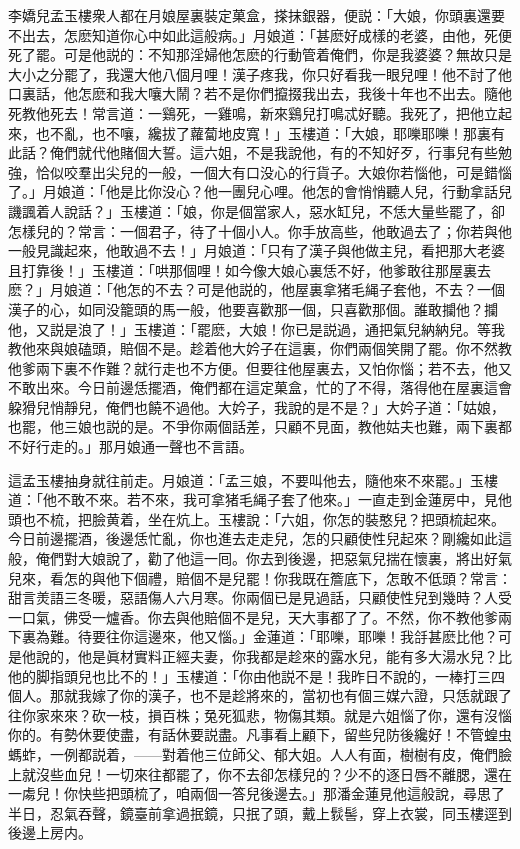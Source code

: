 李嬌兒孟玉樓衆人都在月娘屋裏裝定菓盒，搽抹銀器，便説：「大娘，你頭裏還要不出去，怎麽知道你心中如此這般病。」月娘道：「甚麽好成樣的老婆，由他，死便死了罷。可是他説的：不知那淫婦他怎麽的行動管着俺們，你是我婆婆？無故只是大小之分罷了，我還大他八個月哩！漢子疼我，你只好看我一眼兒哩！他不討了他口裏話，他怎麽和我大嚷大鬧？若不是你們攛掇我出去，我後十年也不出去。隨他死教他死去！常言道：一鷄死，一雞鳴，新來鷄兒打鳴忒好聽。我死了，把他立起來，也不亂，也不嚷，纔拔了蘿蔔地皮寬！」玉樓道：「大娘，耶嚛耶嚛！那裏有此話？俺們就代他賭個大誓。這六姐，不是我說他，有的不知好歹，行事兒有些勉強，恰似咬羣出尖兒的一般，一個大有口没心的行貨子。大娘你若惱他，可是錯惱了。」月娘道：「他是比你没心？他一團兒心哩。他怎的會悄悄聽人兒，行動拿話兒譏諷着人說話？」玉樓道：「娘，你是個當家人，惡水缸兒，不恁大量些罷了，卻怎樣兒的？常言：一個君子，待了十個小人。你手放高些，他敢過去了；你若與他一般見識起來，他敢過不去！」月娘道：「只有了漢子與他做主兒，看把那大老婆且打靠後！」玉樓道：「哄那個哩！如今像大娘心裏恁不好，他爹敢往那屋裏去麽？」月娘道：「他怎的不去？可是他説的，他屋裏拿猪毛䋲子套他，不去？一個漢子的心，如同没籠頭的馬一般，他要喜歡那一個，只喜歡那個。誰敢攔他？攔他，又説是浪了！」玉樓道：「罷麽，大娘！你已是説過，通把氣兒納納兒。等我教他來與娘磕頭，賠個不是。趁着他大妗子在這裏，你們兩個笑開了罷。你不然教他爹兩下裏不作難？就行走也不方便。但要往他屋裏去，又怕你惱；若不去，他又不敢出來。今日前邊恁擺酒，俺們都在這定菓盒，忙的了不得，落得他在屋裏這會躱猾兒悄靜兒，俺們也饒不過他。大妗子，我說的是不是？」大妗子道：「姑娘，也罷，他三娘也説的是。不爭你兩個話差，只顧不見面，教他姑夫也難，兩下裏都不好行走的。」那月娘通一聲也不言語。

這孟玉樓抽身就往前走。月娘道：「孟三娘，不要叫他去，隨他來不來罷。」玉樓道：「他不敢不來。若不來，我可拿猪毛䋲子套了他來。」一直走到金蓮房中，見他頭也不梳，把臉黄着，坐在炕上。玉樓說：「六姐，你怎的裝憨兒？把頭梳起來。今日前邊擺酒，後邊恁忙亂，你也進去走走兒，怎的只顧使性兒起來？剛纔如此這般，俺們對大娘說了，勸了他這一囘。你去到後邊，把惡氣兒揣在懷裏，將出好氣兒來，看怎的與他下個禮，賠個不是兒罷！你我既在簷底下，怎敢不低頭？常言：甜言羙語三冬暖，惡語傷人六月寒。你兩個已是見過話，只顧使性兒到幾時？人受一口氣，佛受一爐香。你去與他賠個不是兒，天大事都了了。不然，你不教他爹兩下裏為難。待要往你這邊來，他又惱。」金蓮道：「耶嚛，耶嚛！我㧱甚麽比他？可是他說的，他是眞材實料正經夫妻，你我都是趁來的露水兒，能有多大湯水兒？比他的脚指頭兒也比不的！」玉樓道：「你由他説不是！我昨日不說的，一棒打三四個人。那就我嫁了你的漢子，也不是趁將來的，當初也有個三媒六證，只恁就跟了往你家來來？砍一枝，損百株；兔死狐悲，物傷其類。就是六姐惱了你，還有沒惱你的。有勢休要使盡，有話休要説盡。凡事看上顧下，留些兒防後纔好！不管蝗虫螞蚱，一例都説着，——對着他三位師父、郁大姐。人人有面，樹樹有皮，俺們臉上就沒些血兒！一切來往都罷了，你不去卻怎樣兒的？少不的逐日唇不離腮，還在一䖏兒！你快些把頭梳了，咱兩個一答兒後邊去。」那潘金蓮見他這般說，尋思了半日，忍氣吞聲，鏡臺前拿過抿鏡，只抿了頭，戴上䯼髻，穿上衣裳，同玉樓逕到後邊上房内。

